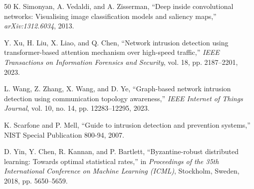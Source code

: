 \documentclass[preprint,12pt]{elsarticle}
\begin{document}
\begin{thebibliography}{50}
K. Simonyan, A. Vedaldi, and A. Zisserman, ``Deep inside convolutional networks: Visualising image classification models and saliency maps,'' \emph{arXiv:1312.6034}, 2013.

Y. Xu, H. Liu, X. Liao, and Q. Chen, ``Network intrusion detection using transformer-based attention mechanism over high-speed traffic,'' \emph{IEEE Transactions on Information Forensics and Security}, vol. 18, pp. 2187--2201, 2023.

L. Wang, Z. Zhang, X. Wang, and D. Ye, ``Graph-based network intrusion detection using communication topology awareness,'' \emph{IEEE Internet of Things Journal}, vol. 10, no. 14, pp. 12283--12295, 2023.

K. Scarfone and P. Mell, ``Guide to intrusion detection and prevention systems,'' NIST Special Publication 800-94, 2007.

D. Yin, Y. Chen, R. Kannan, and P. Bartlett, ``Byzantine-robust distributed learning: Towards optimal statistical rates,'' in \emph{Proceedings of the 35th International Conference on Machine Learning (ICML)}, Stockholm, Sweden, 2018, pp. 5650--5659.

\end{thebibliography}
\end{document}
